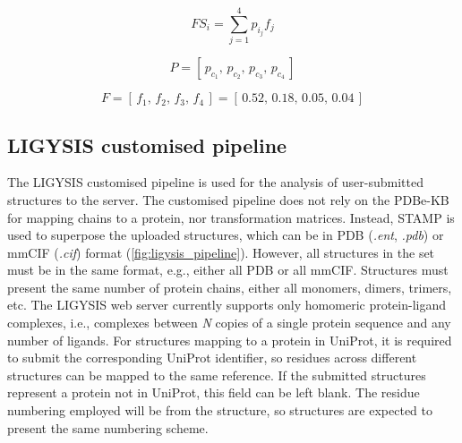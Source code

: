\begin{equation}
FS_i = \sum_{j=1}^{4} p_{i_{j}} f_j
\label{eq:func_score}
\end{equation}

\vspace{-12pt} %
\vspace{-12pt} %

\begin{equation}
P = [\,p_{c_1},\,p_{c_2},\,p_{c_3},\,p_{c_4}\,]
\label{eq:probability_vector}
\end{equation}

\vspace{-12pt} %
\vspace{-12pt} %

\begin{equation}
F = [\,f_{1},\,f_{2},\,f_{3},\,f_{4}\,] 
    = [\,0.52,\,0.18,\,0.05,\,0.04\,]
\label{eq:func_prob_vector}
\end{equation}

\vspace{-12pt} %
\vspace{-12pt} %

\subsection{LIGYSIS customised pipeline}

The LIGYSIS customised pipeline is used for the analysis of user-submitted structures to the server. The customised pipeline does not rely on the PDBe-KB for mapping chains to a protein, nor transformation matrices. Instead, STAMP \cite{RUSSELL_1992_STAMP} is used to superpose the uploaded structures, which can be in PDB (\textit{.ent}, \textit{.pdb}) or mmCIF (\textit{.cif}) format (\autoref{fig:ligysis_pipeline}). However, all structures in the set must be in the same format, e.g., either all PDB or all mmCIF. Structures must present the same number of protein chains, either all monomers, dimers, trimers, etc. The LIGYSIS web server currently supports only homomeric protein-ligand complexes, i.e., complexes between \textit{N} copies of a single protein sequence and any number of ligands. For structures mapping to a protein in UniProt, it is required to submit the corresponding UniProt identifier, so residues across different structures can be mapped to the same reference. If the submitted structures represent a protein not in UniProt, this field can be left blank. The residue numbering employed will be from the structure, so structures are expected to present the same numbering scheme.

